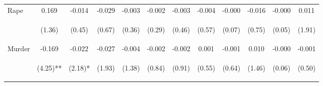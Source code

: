 \begin{tabular}{lccccccccccc}
\noalign{\smallskip}Rape & 0.169 & -0.014 & -0.029 & -0.003 & -0.002 & -0.003 & -0.004 & -0.000 & -0.016 & -0.000 & 0.011\\
 & \begin{footnotesize}(1.36)\end{footnotesize} & \begin{footnotesize}(0.45)\end{footnotesize} & \begin{footnotesize}(0.67)\end{footnotesize} & \begin{footnotesize}(0.36)\end{footnotesize} & \begin{footnotesize}(0.29)\end{footnotesize} & \begin{footnotesize}(0.46)\end{footnotesize} & \begin{footnotesize}(0.57)\end{footnotesize} & \begin{footnotesize}(0.07)\end{footnotesize} & \begin{footnotesize}(0.75)\end{footnotesize} & \begin{footnotesize}(0.05)\end{footnotesize} & \begin{footnotesize}(1.91)\end{footnotesize}\\
\noalign{\smallskip}Murder & -0.169 & -0.022 & -0.027 & -0.004 & -0.002 & -0.002 & 0.001 & -0.001 & 0.010 & -0.000 & -0.001\\
 & \begin{footnotesize}(4.25)**\end{footnotesize} & \begin{footnotesize}(2.18)*\end{footnotesize} & \begin{footnotesize}(1.93)\end{footnotesize} & \begin{footnotesize}(1.38)\end{footnotesize} & \begin{footnotesize}(0.84)\end{footnotesize} & \begin{footnotesize}(0.91)\end{footnotesize} & \begin{footnotesize}(0.55)\end{footnotesize} & \begin{footnotesize}(0.64)\end{footnotesize} & \begin{footnotesize}(1.46)\end{footnotesize} & \begin{footnotesize}(0.06)\end{footnotesize} & \begin{footnotesize}(0.50)\end{footnotesize}\\

\end{tabular}
